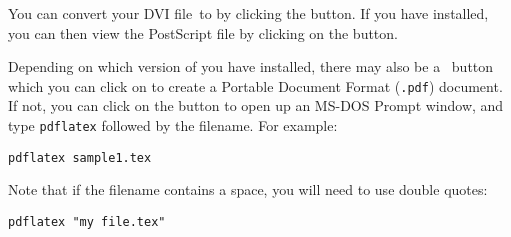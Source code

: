 \label{obj:winedtdvips}
You can convert your DVI file\indexDVI\ to  by clicking 
the  button.  
If you have  installed, you can then view
the PostScript file by clicking on the 
 button.  

Depending on which version of  you have installed,
there may also be a \iPDFLaTeX\ button which you can click on to
create a Portable Document Format (\texttt{.pdf}) document.  If not,
you can click on the 
 button to 
open up an MS-DOS Prompt window, and type \texttt{pdflatex} followed by 
the filename. For example:
\begin{verbatim}
pdflatex sample1.tex
\end{verbatim}
Note that if the filename contains a
space, you will need to use double quotes:
\begin{verbatim}
pdflatex "my file.tex"
\end{verbatim}

